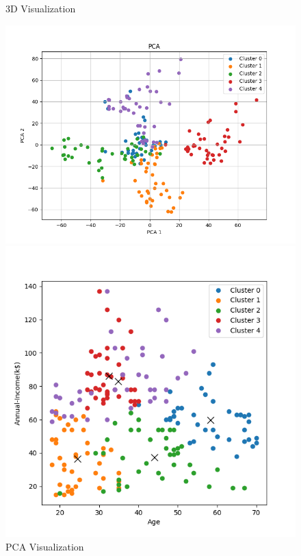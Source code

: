\documentclass[8pt]{article}
\begin{document}
\begin{figure}[H]
\begin{minipage}{0.32\textwidth}
        \caption{3D Visualization}
        \label{fig: 3D k5 com con min20}
    \end{minipage}
    \hfill
    \begin{minipage}{0.32\textwidth}
        \centering
        \includegraphics[width=\textwidth]{./Prob4/out/task3_2_com/images/PCA_k5.png}
        \caption{PCA Visualization}
        \label{PCA k5 com con min20}
    \end{minipage}
    \hfill
    \begin{minipage}{0.32\textwidth}
        \centering
        \includegraphics[width=\textwidth]{./Prob4/out/task3_2_com/images/cluster_result_k5_0_1.png}

\end{minipage}
\end{figure}
\end{document}
